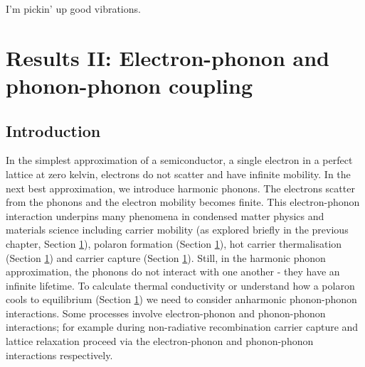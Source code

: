 \begin{savequote}[8cm]
I'm pickin' up good vibrations.
\end{savequote}


\chapter{\label{ch:5-epcoupling}Results II: Electron-phonon and phonon-phonon coupling}
\section{Introduction} \label{ch5:introduction}

In the simplest approximation of a semiconductor, a single electron in a perfect lattice at zero kelvin, electrons do not scatter and have infinite mobility. In the next best approximation, we introduce harmonic phonons. The electrons scatter from the phonons and the electron mobility becomes finite. This electron-phonon interaction underpins many phenomena in condensed matter physics and materials science including carrier mobility (as explored briefly in the previous chapter, Section \ref{}), polaron formation (Section \ref{}), hot carrier thermalisation (Section \ref{}) and carrier capture (Section \ref{}). Still, in the harmonic phonon approximation, the phonons do not interact with one another - they have an infinite lifetime. To calculate thermal conductivity or understand how a polaron cools to equilibrium (Section \ref{}) we need to consider anharmonic phonon-phonon interactions. Some processes involve electron-phonon and phonon-phonon interactions; for example during non-radiative recombination carrier capture and lattice relaxation proceed via the electron-phonon and phonon-phonon interactions respectively. 

